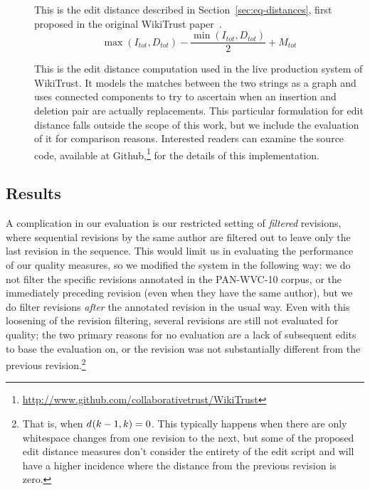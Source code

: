 \begin{description}
\item[] This is the edit distance described in
    Section~\ref{sec:eq-distances}, first proposed in
    the original WikiTrust paper~\cite{Adler2007}.
    \begin{equation*}
    \max(I_{tot}, D_{tot}) - \frac{\min(I_{tot}, D_{tot})}{2}
		+ M_{tot}
    \end{equation*}

\item[] This is the edit distance computation used
    in the live production system of WikiTrust.
    It models the matches between the two strings as a graph and uses
    connected components to try to ascertain when an insertion and
    deletion pair are actually replacements.
    This particular formulation for edit distance falls outside the
    scope of this work, but we include the evaluation of it for
    comparison reasons.
    Interested readers can examine the source code, available at
    Github,\footnote{\url{http://www.github.com/collaborativetrust/WikiTrust}}
    for the details of this implementation.

\end{description}

\subsection{Results}

A complication in our evaluation is our restricted setting of
\textit{filtered} revisions, where sequential revisions by the
same author are filtered out to leave only the last revision
in the sequence.
This would limit us in evaluating the performance of our
quality measures, so we modified the system in the following way:
we do not filter the specific revisions annotated in the PAN-WVC-10 corpus,
or the immediately preceding revision (even when they have the
same author), but we do filter revisions \textit{after} the annotated
revision in the usual way.
Even with this loosening of the revision filtering, several
revisions are still not evaluated for quality; the two
primary reasons for no evaluation are a lack of subsequent
edits to base the evaluation on, or the revision was not
substantially different from the previous
revision.\footnote{That is, when $d_{}(k-1,k) = 0$.
This typically happens when there are only whitespace changes
from one revision to the next, but some of the proposed edit distance
measures don't consider the entirety of the edit script and
will have a higher incidence where the distance from the
previous revision is zero.}

